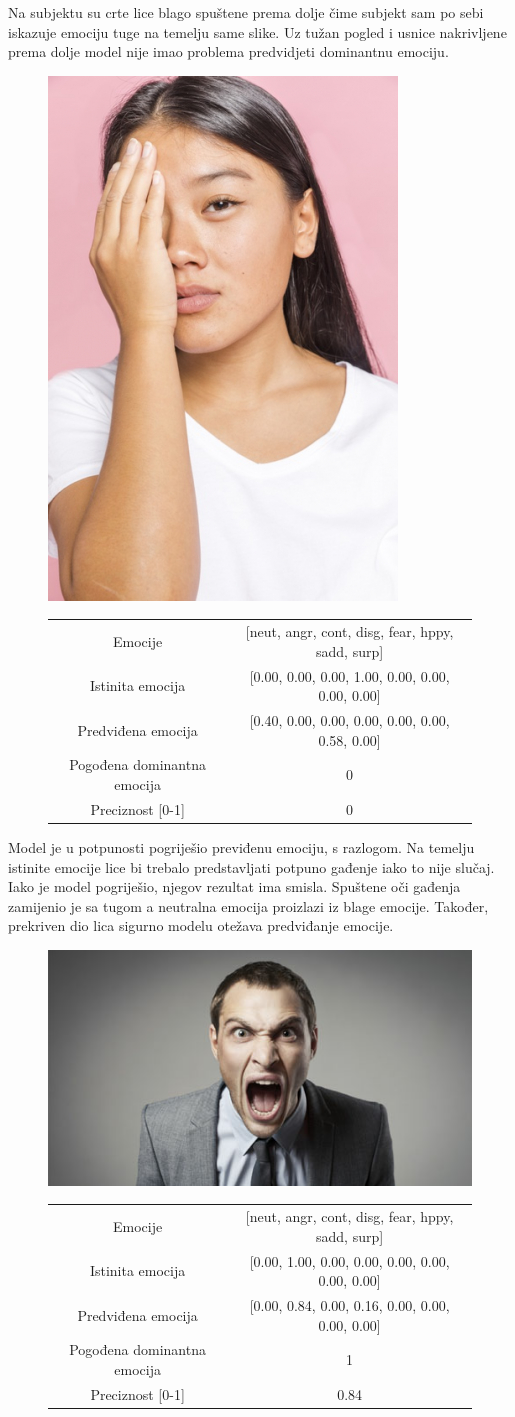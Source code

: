 \documentclass[times, utf8, zavrsni,numeric,pstricks]{fer}
\begin{document}
Na subjektu su crte lice blago spuštene prema dolje čime subjekt sam po sebi iskazuje emociju tuge na temelju same slike. Uz tužan pogled i usnice nakrivljene prema dolje model nije imao problema predvidjeti dominantnu emociju.

\begin{figure}[H]
\centering
		\includegraphics[width=0.3\linewidth, keepaspectratio]{210aae2259c476fa427d9c75.png}
		\begin{tabular}
					{|c|c|}\hline
					Emocije & [neut, angr, cont, disg, fear, hppy, sadd, surp]\\
					Istinita emocija & [0.00, 0.00, 0.00, 1.00, 0.00, 0.00, 0.00, 0.00]\\
					Predviđena emocija	& [0.40, 0.00, 0.00, 0.00, 0.00, 0.00, 0.58, 0.00]\\
					Pogođena dominantna emocija & 0\\
					Preciznost [0-1] & 0\\
					\hline
		\end{tabular}
\end{figure}

Model je u potpunosti pogriješio previđenu emociju, s razlogom. Na temelju istinite emocije lice bi trebalo predstavljati potpuno gađenje iako to nije slučaj. Iako je model pogriješio, njegov rezultat ima smisla. Spuštene oči gađenja zamijenio je sa tugom a neutralna emocija proizlazi iz blage emocije. Također, prekriven dio lica sigurno modelu otežava predviđanje emocije.

\begin{figure}[H]
\centering
		\includegraphics[width=0.3\linewidth, keepaspectratio]{57aangry-main.png}
		\begin{tabular}
					{|c|c|}\hline
					Emocije & [neut, angr, cont, disg, fear, hppy, sadd, surp]\\
					Istinita emocija & [0.00, 1.00, 0.00, 0.00, 0.00, 0.00, 0.00, 0.00]\\
					Predviđena emocija	& [0.00, 0.84, 0.00, 0.16, 0.00, 0.00, 0.00, 0.00]\\
					Pogođena dominantna emocija & 1\\
					Preciznost [0-1] & 0.84\\
					\hline
		\end{tabular}
\end{figure}
\end{document}
